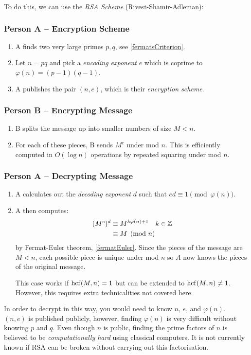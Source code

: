 \documentclass[../main.tex]{subfiles}
\begin{document}
To do this, we can use the \textit{RSA Scheme} (Rivest-Shamir-Adleman):
\subsubsection{Person A -- Encryption Scheme}
\begin{enumerate}
  \item A finds two very large primes $p, q$, see \cref{fermatsCriterion}.
  \item Let $n = pq$ and pick a \textit{encoding exponent} $e$ which is coprime to $\varphi(n) = (p - 1)(q - 1)$.
  \item A publishes the pair $(n, e)$, which is their \textit{encryption scheme}.
\end{enumerate}
\subsubsection{Person B -- Encrypting Message}
\begin{enumerate}
  \item B splits the message up into smaller numbers of size $M < n$.
  \item For each of these pieces, B sends $M^{e}$ under mod $n$.
    This is efficiently computed in $O(\log n)$ operations by repeated squaring under mod $n$.
\end{enumerate}
\subsubsection{Person A -- Decrypting Message}
\begin{enumerate}
  \item A calculates out the \textit{decoding exponent} $d$ such that $ed \equiv 1 \pmod{\varphi(n)}$.
  \item A then computes:
    \begin{align*}
      (M^{e})^{d} &\equiv M^{k\varphi(n) + 1} \quad k \in \mathbb{Z} \\
                  &\equiv M \pmod{n}
    \end{align*}
    by Fermat-Euler theorem, \cref{fermatEuler}.
    Since the pieces of the message are $M < n$, each possible piece is unique under mod $n$ so $A$ now knows the pieces of the original message.

    This case works if $\operatorname{hcf}(M, n) = 1$ but can be extended to $\operatorname{hcf}(M, n) \neq 1$.
    However, this requires extra technicalities not covered here.
\end{enumerate}
In order to decrypt in this way, you would need to know $n$, $e$, and $\varphi(n)$.
$(n, e)$ is published publicly, however, finding $\varphi(n)$ is very difficult without knowing $p$ and $q$.
Even though $n$ is public, finding the prime factors of $n$ is believed to be \textit{computationally hard} using classical computers.
It is not currently known if RSA can be broken without carrying out this factorisation.
\end{document}
